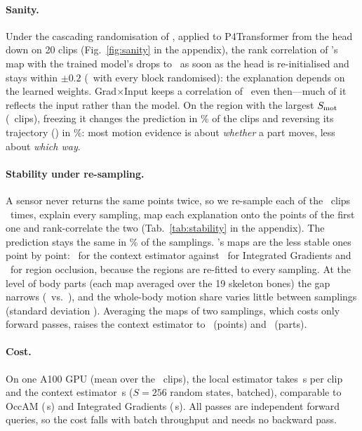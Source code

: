 \paragraph{Sanity.} Under the cascading randomisation of \citet{adebayo2018sanity}, applied to P4Transformer from the head down on 20 clips (Fig.~\ref{fig:sanity} in the appendix), the rank correlation of \method's map with the trained model's drops to \NumSanHeadKca\ as soon as the head is re-initialised and stays within $\pm0.2$ (\NumSanKca\ with every block randomised): the explanation depends on the learned weights. Grad$\times$Input keeps a correlation of \NumSanGxI\ even then---much of it reflects the input rather than the model. On the region with the largest $S_{\mathrm{mot}}$ (\NumCrossClips\ clips), freezing it changes the prediction in \NumDspFreezeFlip\% of the clips and reversing its trajectory (\dsp) in \NumDspReverseFlip\%: most motion evidence is about \emph{whether} a part moves, less about \emph{which way}.

\paragraph{Stability under re-sampling.} A sensor never returns the same points twice, so we re-sample each of the \NumCrossClips\ clips \NumStabSamplings\ times, explain every sampling, map each explanation onto the points of the first one and rank-correlate the two (Tab.~\ref{tab:stability} in the appendix). The prediction stays the same in \NumStabPredSame\% of the samplings. \method's maps are the less stable ones point by point: \NumStabKcaCtxPoint\ for the context estimator against \NumStabIGPoint\ for Integrated Gradients and \NumStabOcclPoint\ for region occlusion, because the regions are re-fitted to every sampling. At the level of body parts (each map averaged over the 19 skeleton bones) the gap narrows (\NumStabKcaCtxPart\ vs.\ \NumStabIGPart), and the whole-body motion share varies little between samplings (standard deviation \NumStabKcaCtxShareSD). Averaging the maps of two samplings, which costs only forward passes, raises the context estimator to \NumStabKcaCtxAvgPoint\ (points) and \NumStabKcaCtxAvgPart\ (parts).

\paragraph{Cost.} On one A100 GPU (mean over the \NumPFTClips\ clips), the local estimator takes \NumPFTKcaTime\,s per clip and the context estimator \NumPFTKcaCtxTime\,s ($S{=}256$ random states, batched), comparable to OccAM (\NumPFTOccamTime\,s) and Integrated Gradients (\NumPFTIGTime\,s). All passes are independent forward queries, so the cost falls with batch throughput and needs no backward pass.

